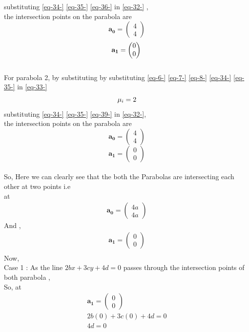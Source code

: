 \documentclass[journal,12pt,twocolumn]{IEEEtran}
\newcommand{\myvec}[1]{\ensuremath{\begin{pmatrix}#1\end{pmatrix}}}
\let\vec\mathbf
\let\vec\mathbf
\begin{document}
{substituting \eqref{eq-34-} \eqref{eq-35-} \eqref{eq-36-} in \eqref{eq-32-} ,\\
the intersection points on the parabola are
\begin{equation}
\vec{a_0}=\myvec{4\\4}
\end{equation}
\begin{equation}
\vec{a_1}=\myvec{0\\0} \\ 
\end{equation}\\
For parabola 2,
by substituting by substituting \eqref{eq-6-} \eqref{eq-7-} \eqref{eq-8-} \eqref{eq-34-} \eqref{eq-35-}  in  \eqref{eq-33-}
\begin{equation}
\mu_i=2
\label{eq-39-} \\ 
\end{equation}
substituting \eqref{eq-34-} \eqref{eq-35-} \eqref{eq-39-} in \eqref{eq-32-},\\
the intersection points on the parabola are
\begin{equation}
\vec{a_0}=\myvec{4\\4}
\end{equation}
\begin{equation}
\vec{a_1}=\myvec{0\\0}
\end{equation}\\
So, Here we can clearly see that the both the Parabolas are intersecting each other at two points i.e \\
at  \begin{align}
\vec{a_0}=\myvec{4a\\4a}
\end{align}
And ,\\
\begin{align}
 \vec{a_1}=\myvec{0\\0} \\
\end{align}
Now,\\
Case 1 :
As the line $ 2bx+3cy+4d = 0$ passes through the intersection points of both parabola ,\\
So, at \\
\begin{align}
\vec{a_1}=\myvec{0\\0}
\\
 2b(0)+3c(0)+4d = 0 \\
  4d =0  \\
\end{align}
}
\end{document}
